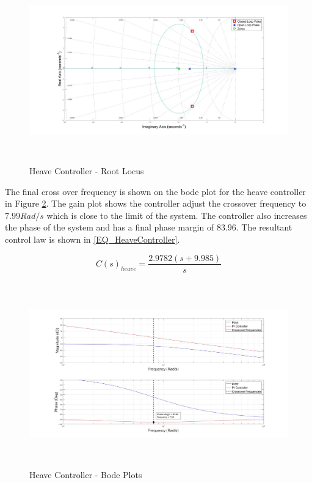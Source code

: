 \documentclass[12pt]{report}
\begin{document}
	\begin{figure}[H]
		\centering
		\includegraphics[height = 8cm]{../Design/Matlab/Controllers/heave_root.jpg}
		\caption{Heave Controller -  Root Locus}
		\label{IM_HeaveControlRoot}
	\end{figure}
	
	The final cross over frequency is shown on the bode plot for the heave controller in Figure \ref{IM_HeaveControlBode}. The gain plot shows the controller adjust the crossover frequency to $7.99 Rad/s$ which is close to the limit of the system. The controller also increases the phase of the system and has a final phase margin of $83.96$\textdegree. The resultant control law is shown in \eqref{EQ_HeaveController}.
	
	\begin{equation}
	\label{EQ_HeaveController}
	C(s)_{heave} = \frac{2.9782 (s + 9.985)}{s}
	\end{equation}		
	
	\begin{figure}[H]
		\centering
		\includegraphics[height = 8cm]{../Design/Matlab/Controllers/heave_bode.jpg}
		\caption{Heave Controller -  Bode Plots}
		\label{IM_HeaveControlBode}
	\end{figure}
	
\end{document}
